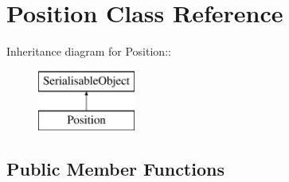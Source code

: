\hypertarget{classPosition}{
\section{Position Class Reference}
\label{classPosition}
}
Inheritance diagram for Position::\begin{figure}[H]
\begin{center}
\leavevmode
\includegraphics[height=2cm]{classPosition}
\end{center}
\end{figure}
\subsection*{Public Member Functions}
